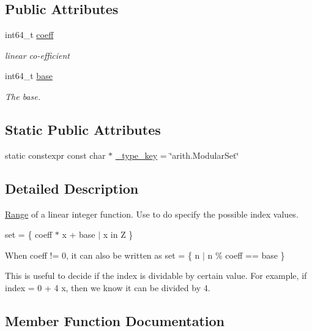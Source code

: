 \subsection*{Public Attributes}
\begin{DoxyCompactItemize}
\item 
int64\+\_\+t \hyperlink{classtvm_1_1arith_1_1ModularSetNode_a0531d08d8529454c726a9a20a2002ee6}{coeff}
\begin{DoxyCompactList}\small\item\em linear co-\/efficient \end{DoxyCompactList}\item 
int64\+\_\+t \hyperlink{classtvm_1_1arith_1_1ModularSetNode_afe63e5586712774be5935e86121431ad}{base}
\begin{DoxyCompactList}\small\item\em The base. \end{DoxyCompactList}\end{DoxyCompactItemize}
\subsection*{Static Public Attributes}
\begin{DoxyCompactItemize}
\item 
static constexpr const char $\ast$ \hyperlink{classtvm_1_1arith_1_1ModularSetNode_aabf5ea254b6e5252f95aadbe35f6e889}{\+\_\+type\+\_\+key} = \char`\"{}arith.\+Modular\+Set\char`\"{}
\end{DoxyCompactItemize}


\subsection{Detailed Description}
\hyperlink{classtvm_1_1Range}{Range} of a linear integer function. Use to do specify the possible index values. 

set = \{ coeff $\ast$ x + base $\vert$ x in Z \}

When coeff != 0, it can also be written as set = \{ n $\vert$ n \% coeff == base \}

This is useful to decide if the index is dividable by certain value. For example, if index = 0 + 4 x, then we know it can be divided by 4. 

\subsection{Member Function Documentation}
